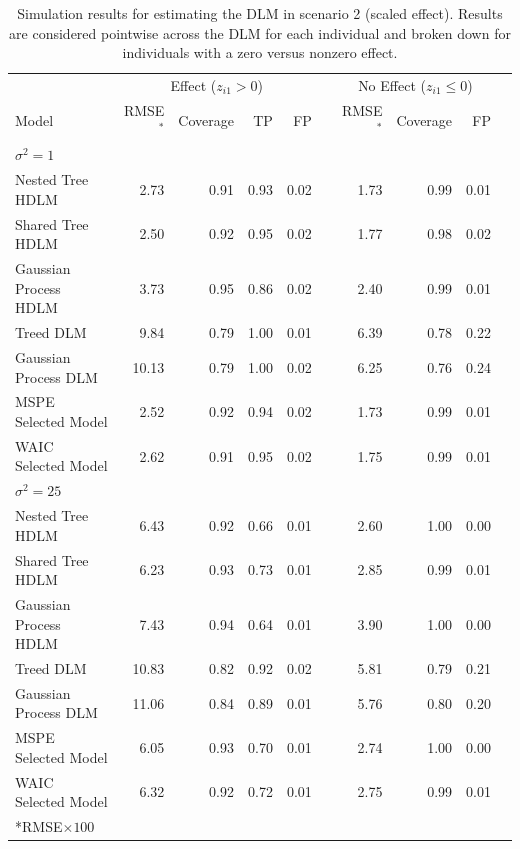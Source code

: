 \documentclass[12pt]{article}
\begin{document}
\begin{table}[!ht]
 \scriptsize
    \centering
    \caption{Simulation results for estimating the DLM in scenario 2 (scaled effect). Results are considered pointwise across the DLM for each individual and broken down for individuals with a zero versus nonzero effect.}\vspace{6pt}
    \label{tab:scen2_res}
    \begin{tabular}{lrrrrrrrrr}
        \toprule[2pt]
        &\multicolumn{4}{c}{Effect ($z_{i1}>0$)}&&\multicolumn{3}{c}{No Effect ($z_{i1}\leq0$)}\\
        \cmidrule(lr){2-5} \cmidrule(lr){7-9} 
        Model & RMSE$^*$ & Coverage & TP & FP & \phantom{a} &RMSE$^*$ & Coverage & FP \\
        \midrule
        \multicolumn{9}{l}{$\sigma^2=1$}\\
      Nested Tree HDLM & 2.73 & 0.91 & 0.93 & 0.02 &  & 1.73 & 0.99 & 0.01\\
      Shared Tree HDLM & 2.50 & 0.92 & 0.95 & 0.02 &  & 1.77 & 0.98 & 0.02 \\
 Gaussian Process HDLM & 3.73 & 0.95 & 0.86 & 0.02 &  & 2.40 & 0.99 & 0.01 \\
\addlinespace
             Treed DLM & 9.84 & 0.79 & 1.00 & 0.01 &  & 6.39 & 0.78 & 0.22 \\
               Gaussian Process DLM & 10.13 & 0.79 & 1.00 & 0.02 &  & 6.25 & 0.76 & 0.24 \\
\addlinespace
MSPE Selected Model & 2.52 & 0.92 & 0.94 & 0.02 &  & 1.73 & 0.99 & 0.01  \\
WAIC Selected Model & 2.62 & 0.91 & 0.95 & 0.02 &  & 1.75 & 0.99 & 0.01   \\
        \midrule
        
        
        \multicolumn{9}{l}{$\sigma^2=25$}\\
              Nested Tree HDLM & 6.43 & 0.92 & 0.66 & 0.01 &  & 2.60 & 1.00 & 0.00 \\
      Shared Tree HDLM & 6.23 & 0.93 & 0.73 & 0.01 &  & 2.85 & 0.99 & 0.01\\
 Gaussian Process HDLM & 7.43 & 0.94 & 0.64 & 0.01 &  & 3.90 & 1.00 & 0.00 \\
\addlinespace
            Treed DLM & 10.83 & 0.82 & 0.92 & 0.02 &  & 5.81 & 0.79 & 0.21 \\
               Gaussian Process DLM & 11.06 & 0.84 & 0.89 & 0.01 &  & 5.76 & 0.80 & 0.20 \\
\addlinespace
MSPE Selected Model & 6.05 & 0.93 & 0.70 & 0.01 &  & 2.74 & 1.00 & 0.00   \\
WAIC Selected Model & 6.32 & 0.92 & 0.72 & 0.01 &  & 2.75 & 0.99 & 0.01   \\
        
        
        \bottomrule[2pt]
        \multicolumn{9}{l}{*RMSE$\times100$}\\
    \end{tabular}
\end{table}
\end{document}
